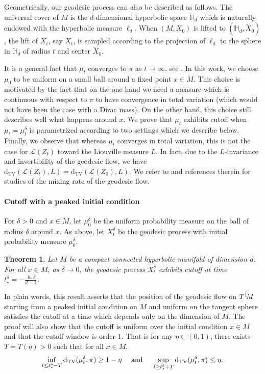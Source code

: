 \documentclass[]{scrartcl}
\newcommand{\DTV}{\mathrm{d_{TV}}}
\newcommand{\cL}{\mathcal L}
\newtheorem{theorem}{Theorem}[section]
\numberwithin{equation}{section}
\numberwithin{figure}{section}
\begin{document}
Geometrically, our geodesic process can also be described as follows. The universal cover of $M$ is the $d$-dimensional hyperbolic space $\mathds{H}_d$ which is naturally endowed with the hyperbolic measure $\ell_{d}$. 
When $(M,X_0)$ is lifted to $(\mathds{H}_d,\widetilde X_0)$, the lift of $X_t$, say $\widetilde X_t$, is sampled according to the projection  of $\ell_d$ to the sphere in $\mathds{H}_d$ of radius $t$ and center $\widetilde X_0$. 

It is a general fact that $\mu_t$ converges to $\pi$ as $t \to \infty$, see \cite{MR200874,MR1306567,pjm}. In this work, we choose $\mu_0$ to be uniform on a small ball around a fixed point $x \in M$. This choice is motivated by the fact that on the one hand we need a measure which is continuous with respect to $\pi$ to have convergence in total variation (which would not have been the case with a Dirac mass). On the other hand, this choice still describes well what happens around $x$. We prove that $\mu_t$ exhibits cutoff when $ \mu_t = \mu_t^\delta$ is parametrized according to two settings which we describe below. Finally, we observe that whereas $\mu_t$ converges in total variation, this is not the case for $\cL(Z_t)$ toward the Liouville measure $L$. In fact, due to the $L$-invariance and invertibility of the geodesic flow, we have $\DTV( \cL(Z_t) , L) = \DTV ( \cL(Z_0),L)$. We refer to \cite{MR896798,MR3338007} and references therein for studies of the mixing rate of the geodesic flow.
	
\paragraph{Cutoff with a peaked initial condition}
For $\delta >0$ and $x \in M$, let $\mu_0^\delta$ be the uniform probability measure on the ball of radius $\delta$ around $x$. As above, let $X_t^\delta$ be the geodesic process with initial probability measure $\mu_0^\delta$. 


\begin{theorem}{}\label{th:D1}
	Let $M$ be a compact connected hyperbolic manifold of dimension $d$. For all $x \in M$, as $\delta \to 0$, the geodesic process $X^\delta_t$ exhibits  cutoff at time $t^\delta_\star = -\frac{\ln \delta}{d-1}$.
\end{theorem}


In plain words, this result asserts that the position of the geodesic flow on $T^1\hspace{-2pt}M$ starting from a peaked initial condition on $M$ and uniform on the tangent sphere satisfies the cutoff at a time which depends only on the dimension of $M$. The proof will also show that the cutoff is uniform over the initial condition $x \in M$ and that the cutoff window is order $1$. That is for any $\eta \in (0,1)$, there exists $T  = T(\eta)>0$ such that for all $x \in M$,
$$ \inf_{t \leq  t_\star^\delta - T} \DTV (\mu^\delta_t,\pi)  \geq 1 - \eta \quad \hbox{ and } \quad  	 \sup_{t \geq  t_\star^\delta  + T} \DTV (\mu^\delta_t,\pi ) \leq \eta.
	$$
\end{document}
